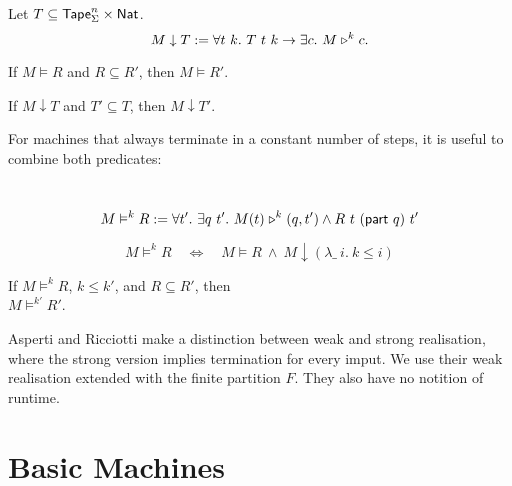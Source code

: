 \begin{definition}
  \label{def:termination}
  Let $T \subseteq \textsf{Tape}_\Sigma^n \times \textsf{Nat}$.
  \[
    M \downarrow T :=
    \forall t~k.~T~t~k \rightarrow
    \exists c.~M \mathrel{\triangleright}^k c.
  \]
\end{definition}


\begin{lemma}
  \label{lem:Realise_monotone}
  If $M \vDash R$ and $R \subseteq R'$, then $M \vDash R'$.
\end{lemma}

\begin{lemma}
  \label{lem:TerminatesIn_monotone}
  If $M \downarrow T$ and $T' \subseteq T$, then $M \downarrow T'$.
\end{lemma}


For machines that always terminate in a constant number of steps, it is useful to combine both predicates:
\begin{definition}
  \label{def:RealiseIn}
  ~
  \[
    M \vDash^k R :=
    \forall t'.~
    \exists q~t'.~
    M(t) \mathrel{\triangleright}^k(q, t') \land R~t~(\textsf{part}~q)~t'
  \]
\end{definition}

\begin{lemma}
  \label{lem:Realise_total}
  \[
    M \vDash^k R
    \quad\iff\quad
    M \vDash R ~\land~
    M \downarrow (\lambda \_~i.~k \le i)
  \]
\end{lemma}

\begin{lemma}
  \label{lem:Realise_monotone}
  If $M \vDash^k R$, $k \leq k'$, and $R \subseteq R'$, then \\
  $M \vDash^{k'} R'$.
\end{lemma}

Asperti and Ricciotti \cite{asperti2015} make a distinction between weak and strong realisation, where the strong version implies termination for
every imput.  We use their weak realisation extended with the finite partition $F$.  They also have no notition of runtime.


\section{Basic Machines}
\label{sec:basic_machines}


